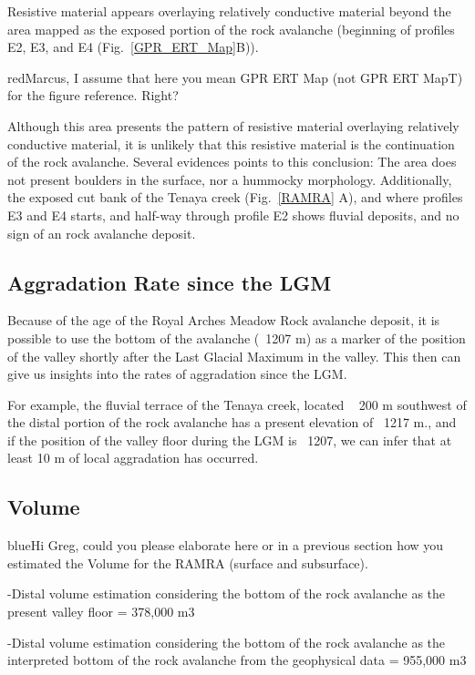 \documentclass[utf8]{frontiersSCNS}
\newcommand{\COMON}{\begin{color}{blue}}
\newcommand{\COMOFF}{\end{color}}
\newcommand{\alon}{\begin{color}{red}}
\newcommand{\aloff}{\end{color}}
\begin{document}
Resistive material appears overlaying relatively conductive material beyond the area mapped as the exposed portion of the rock avalanche (beginning of profiles E2, E3, and E4 (Fig.~\ref{GPR_ERT_Map}B)). \alon Marcus, I assume that here you mean GPR ERT Map (not GPR ERT MapT) for the figure reference. Right? \aloff 

Although this area presents the pattern of resistive material overlaying relatively conductive material, it is unlikely that this resistive material is the continuation of the rock avalanche. Several evidences points to this conclusion: The area does not present boulders in the surface, nor a hummocky morphology. Additionally, the exposed cut bank of the Tenaya creek (Fig.~\ref{RAMRA} A), and where profiles E3 and E4 starts, and half-way through profile E2 shows fluvial deposits, and no sign of an rock avalanche deposit.  


\subsection{Aggradation Rate since the LGM}

Because of the age of the Royal Arches Meadow Rock avalanche deposit, it is possible to use the bottom of the avalanche (~1207 m) as a marker of the position of the valley shortly after the Last Glacial Maximum in the valley. This then can give us insights into the rates of aggradation since the LGM. 

For example, the fluvial terrace of the Tenaya creek, located ~ 200 m southwest of the distal portion of the rock avalanche has a present elevation of ~1217 m., and if the position of the valley floor during the LGM is ~1207, we can infer that at least 10 m of local aggradation has occurred. 


\subsection{Volume}

\COMON Hi Greg, could you please elaborate here or in a previous section how you estimated the Volume for the RAMRA (surface and subsurface).
\COMOFF

-Distal volume estimation considering the bottom of the rock avalanche as the present valley floor =  378,000 m3

-Distal volume estimation considering the bottom of the rock avalanche as the interpreted bottom of the rock avalanche from the geophysical data = 955,000 m3 
\end{document}
